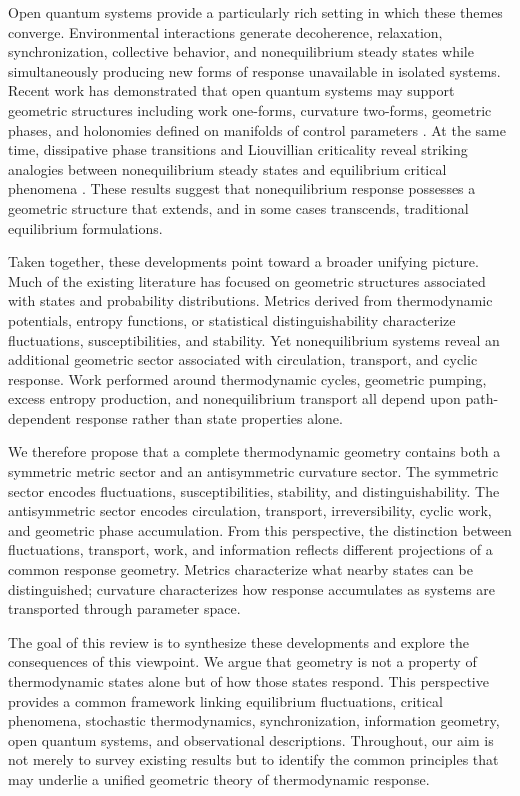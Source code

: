 Open quantum systems provide a particularly rich setting in which these themes converge. Environmental interactions generate decoherence, relaxation, synchronization, collective behavior, and nonequilibrium steady states while simultaneously producing new forms of response unavailable in isolated systems. Recent work has demonstrated that open quantum systems may support geometric structures including work one-forms, curvature two-forms, geometric phases, and holonomies defined on manifolds of control parameters \cite{SivakCrooks2012,NESSGeometry2019,GeometricThermoOQS2026}. At the same time, dissipative phase transitions and Liouvillian criticality reveal striking analogies between nonequilibrium steady states and equilibrium critical phenomena \cite{Prosen2010,DissipativeCriticality2025}. These results suggest that nonequilibrium response possesses a geometric structure that extends, and in some cases transcends, traditional equilibrium formulations.

Taken together, these developments point toward a broader unifying picture. Much of the existing literature has focused on geometric structures associated with states and probability distributions. Metrics derived from thermodynamic potentials, entropy functions, or statistical distinguishability characterize fluctuations, susceptibilities, and stability. Yet nonequilibrium systems reveal an additional geometric sector associated with circulation, transport, and cyclic response. Work performed around thermodynamic cycles, geometric pumping, excess entropy production, and nonequilibrium transport all depend upon path-dependent response rather than state properties alone.

We therefore propose that a complete thermodynamic geometry contains both a symmetric metric sector and an antisymmetric curvature sector. The symmetric sector encodes fluctuations, susceptibilities, stability, and distinguishability. The antisymmetric sector encodes circulation, transport, irreversibility, cyclic work, and geometric phase accumulation. From this perspective, the distinction between fluctuations, transport, work, and information reflects different projections of a common response geometry. Metrics characterize what nearby states can be distinguished; curvature characterizes how response accumulates as systems are transported through parameter space.

The goal of this review is to synthesize these developments and explore the consequences of this viewpoint. We argue that geometry is not a property of thermodynamic states alone but of how those states respond. This perspective provides a common framework linking equilibrium fluctuations, critical phenomena, stochastic thermodynamics, synchronization, information geometry, open quantum systems, and observational descriptions. Throughout, our aim is not merely to survey existing results but to identify the common principles that may underlie a unified geometric theory of thermodynamic response.

